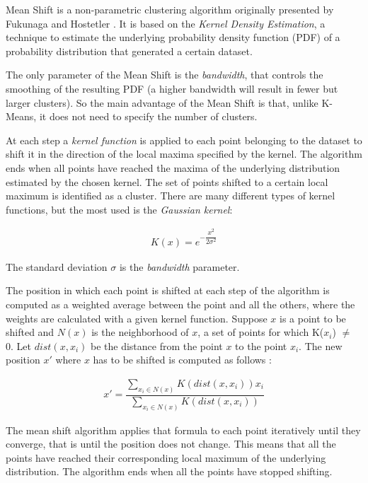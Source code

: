\documentclass[10pt,twocolumn,letterpaper]{article}
\begin{document}
Mean Shift is a non-parametric clustering algorithm originally presented by Fukunaga and Hostetler \cite{fukunaga1975estimation}. It is based on the \textit{Kernel Density Estimation}, a technique to estimate the underlying probability density function (PDF) of a probability distribution that generated a certain dataset.

The only parameter of the Mean Shift is the \emph{bandwidth}, that controls the smoothing of the resulting PDF (\eg a higher bandwidth will result in fewer but larger clusters). So the main advantage of the Mean Shift is that, unlike K-Means, it does not need to specify the number of clusters. 

At each step a \textit{kernel function} is applied to each point belonging to the dataset to shift it in the direction of the local maxima specified by the kernel. The algorithm ends when all points have reached the maxima of the underlying distribution estimated by the chosen kernel. The set of points shifted to a certain local maximum is identified as a cluster. There are many different types of kernel functions, but the most used is the \textit{Gaussian kernel}:

\begin{align}
K(x) =  e^{-\dfrac{x^2}{2\sigma^2}}
\end{align}

The standard deviation $\sigma$ is the \textit{bandwidth} parameter.

The position in which each point is shifted at each step of the algorithm is computed as a weighted average between the point and all the others, where the weights are calculated with a given kernel function. Suppose $x$ is a point to be shifted and  $N(x)$ is the neighborhood of $x$, a set of points for which K($x_i$) $\neq$ 0. Let $dist(x, x_i)$ be the distance from the point $x$ to the point $x_i$. The new position $x'$ where $x$ has to be shifted is computed as follows \cite{Wiki}:

\begin{align}
x' = \dfrac{\sum_{x_i \in N(x)} K(dist(x,x_i)) x_i}{\sum_{x_i \in N(x)} K(dist(x, x_i))}
\end{align}



The mean shift algorithm applies that formula to each point iteratively until they converge, that is until the position does not change. This means that all the points have reached their corresponding local maximum of the underlying distribution. The algorithm ends when all the points have stopped shifting.
\end{document}
